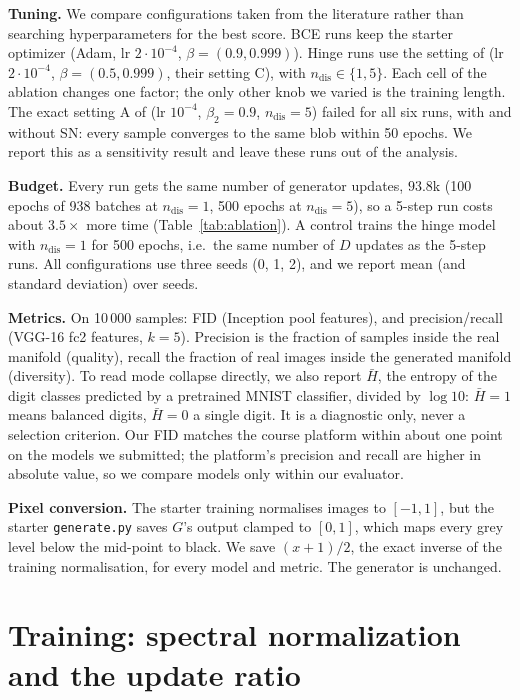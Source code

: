 \documentclass[10pt,a4paper]{article}
\newcommand{\Hc}{\bar H}
\newcommand{\ndis}{n_{\mathrm{dis}}}
\begin{document}
\textbf{Tuning.} We compare configurations taken from the literature rather than searching hyperparameters for the best score. BCE runs keep the starter optimizer (Adam, lr $2\cdot10^{-4}$, $\beta=(0.9,0.999)$). Hinge runs use the setting of \cite{miyato2018} (lr $2\cdot10^{-4}$, $\beta=(0.5,0.999)$, their setting C), with $\ndis\in\{1,5\}$. Each cell of the ablation changes one factor; the only other knob we varied is the training length. The exact setting A of \cite{miyato2018} (lr $10^{-4}$, $\beta_2=0.9$, $\ndis=5$) failed for all six runs, with and without SN: every sample converges to the same blob within 50 epochs. We report this as a sensitivity result and leave these runs out of the analysis.

\textbf{Budget.} Every run gets the same number of generator updates, $93.8$k (100 epochs of 938 batches at $\ndis=1$, 500 epochs at $\ndis=5$), so a 5-step run costs about $3.5\times$ more time (Table~\ref{tab:ablation}). A control trains the hinge model with $\ndis=1$ for 500 epochs, i.e.\ the same number of $D$ updates as the 5-step runs. All configurations use three seeds (0, 1, 2), and we report mean (and standard deviation) over seeds.

\textbf{Metrics.} On 10\,000 samples: FID \cite{heusel2017} (Inception pool features), and precision/recall \cite{kynkaanniemi2019} (VGG-16 fc2 features, $k=5$). Precision is the fraction of samples inside the real manifold (quality), recall the fraction of real images inside the generated manifold (diversity). To read mode collapse directly, we also report $\Hc$, the entropy of the digit classes predicted by a pretrained MNIST classifier, divided by $\log 10$: $\Hc=1$ means balanced digits, $\Hc=0$ a single digit. It is a diagnostic only, never a selection criterion. Our FID matches the course platform within about one point on the models we submitted; the platform's precision and recall are higher in absolute value, so we compare models only within our evaluator.

\textbf{Pixel conversion.} The starter training normalises images to $[-1,1]$, but the starter \texttt{generate.py} saves $G$'s output clamped to $[0,1]$, which maps every grey level below the mid-point to black. We save $(x+1)/2$, the exact inverse of the training normalisation, for every model and metric. The generator is unchanged.

\section{Training: spectral normalization and the update ratio}
\end{document}
